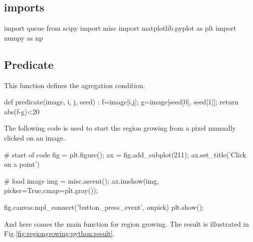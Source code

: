 \def\QRCODE{TB_image_TUT.IMG.segmentation_region_growing_pythonqrcode.png}
\def\QRPAGE{http://www.iptutorials.science/tree/master/TB_image/TUT.IMG.segmentation_region_growing/python}


\subsection{imports}

\begin{python}
import queue
from scipy import misc
import matplotlib.pyplot as plt
import numpy as np
\end{python}

\subsection{Predicate}
This function defines the agregation condition.
\begin{python}
def predicate(image, i, j, seed) :
	f=image[i,j];
	g=image[seed[0], seed[1]];
	return abs(f-g)<20
\end{python}
    
    
The following code is used to start the region growing from a pixel manually clicked on an image.
\begin{python}
# start of code
fig = plt.figure();
ax = fig.add_subplot(211);
ax.set_title('Click on a point')

# load image
img = misc.ascent();
ax.imshow(img, picker=True,cmap=plt.gray());

fig.canvas.mpl_connect('button_press_event', onpick)
plt.show();
\end{python}

And here comes the main function for region growing. The result is illustrated in Fig.\ref{fig:regiongrowing:python:result}.




